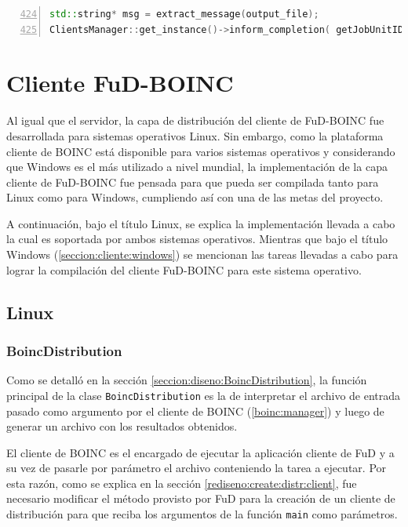\begin{lstlisting}[frame=shadowbox, language=C++, numbers=left, xleftmargin=8mm, framexleftmargin=22pt, basicstyle=\scriptsize, numberstyle=\footnotesize, breaklines=true, breakatwhitespace=false, captionpos=b, caption={Líneas importantes del método \texttt{assimilate\_handler()}}, label=listing:BoincClientProxy:assimilate:handler, backgroundcolor=\color{gris}, texcl=true, firstnumber=424, keywordstyle=\color{Blue}]
std::string* msg = extract_message(output_file);
ClientsManager::get_instance()->inform_completion( getJobUnitID(), msg);
\end{lstlisting}
                

\section{Cliente FuD-BOINC}
Al igual que el servidor, la capa de distribución del cliente de FuD-BOINC fue desarrollada para sistemas operativos Linux. Sin embargo, como la plataforma cliente de BOINC está disponible para varios sistemas operativos y considerando que Windows es el más utilizado a nivel mundial, la implementación de la capa cliente de FuD-BOINC fue pensada para que pueda ser compilada tanto para Linux como para Windows, cumpliendo así con una de las metas del proyecto.

A continuación, bajo el título Linux, se explica la implementación llevada a cabo la cual es soportada por ambos sistemas operativos. Mientras que bajo el título Windows (\ref{seccion:cliente:windows}) se mencionan las tareas llevadas a cabo para lograr la compilación del cliente FuD-BOINC para este sistema operativo.

	\subsection{Linux}
	\subsubsection{BoincDistribution}
Como se detalló en la sección \ref{seccion:diseno:BoincDistribution}, la función principal de la clase \texttt{BoincDistribution} es la de interpretar el archivo de entrada pasado como argumento por el cliente de BOINC (\ref{boinc:manager}) y luego de generar un archivo con los resultados obtenidos.

El cliente de BOINC es el encargado de ejecutar la aplicación cliente de FuD y a su vez de pasarle por parámetro el archivo conteniendo la tarea a ejecutar. Por esta razón, como se explica en la sección \ref{rediseno:create:distr:client}, fue necesario modificar el método provisto por FuD para la creación de un cliente de distribución para que reciba los argumentos de la función \texttt{main} como parámetros.

